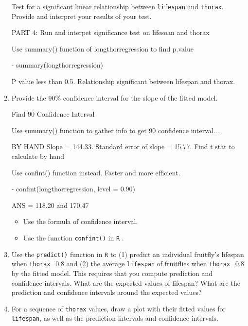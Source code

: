 \documentclass[12pt,letterpaper]{article}
\begin{document}
\begin{enumerate}
	Test for a significant linear relationship between  \texttt{lifespan} and \texttt{thorax}. Provide and interpret your results of your test.

PART 4: Run and interpet significance test on lifesoan and thorax

Use summary() function of longthorregression to find p.value

- summary(longthorregression)

 P value less than 0.5. Relationship significant between lifespan and thorax.
 	
\newpage
	\item
	
	Provide the 90\% confidence interval for the slope of the fitted model.
	
Find 90 Confidence Interval
	
Use summary() function to gather info to get 90 confidence interval...

BY HAND Slope = 144.33. Standard error of slope = 15.77. Find t stat to calculate by hand

Use confint() function instead. Faster and more efficient.
	
- confint(longthorregression, level = 0.90)

ANS = 118.20 and 170.47
			\vspace{.5cm}
	\begin{itemize}
		\item
		Use the formula of confidence interval.		\vspace{.5cm}
		\item
		Use the function  \texttt{confint()}  in \texttt{R} .
	\end{itemize}
			\vspace{6cm}
	\item Use the \texttt{predict()} function in \texttt{R} to (1) predict an individual fruitfly's lifespan when \texttt{thorax}=0.8 and (2) the average \texttt{lifespan} of fruitflies when \texttt{thorax}=0.8 by the fitted model. This requires that you compute prediction and confidence intervals. What are the expected values of lifespan? What are the prediction and confidence intervals around the expected values? 
	
			\vspace{6cm}
	\item	For a sequence of \texttt{thorax} values, draw a plot with their fitted values for \texttt{lifespan}, as well as the prediction intervals and confidence intervals.



\end{enumerate}
\end{document}
